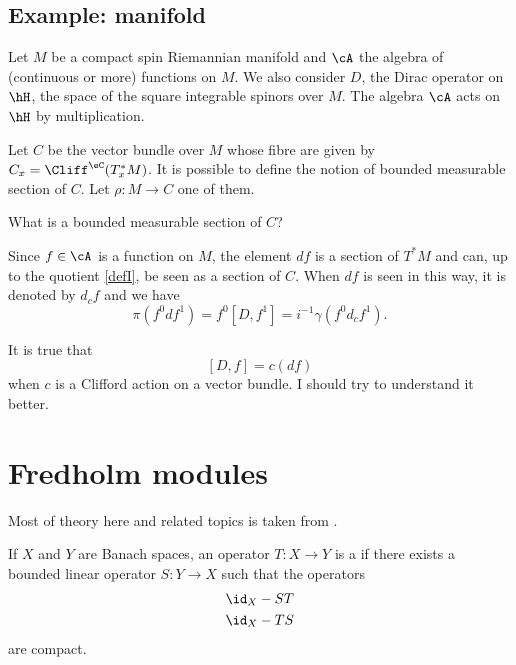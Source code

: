 \subsection{Example: manifold}

Let $M$ be a compact spin Riemannian manifold and $\cA$ the algebra of (continuous or more) functions on $M$. We also consider $D$, the Dirac operator on $\hH$, the space of the square integrable spinors over $M$. The algebra $\cA$ acts on $\hH$ by multiplication.

Let $C$ be the vector bundle over $M$ whose fibre are given by $C_x=\Cliff^{\eC}(T^*_xM)$. It is possible to define the notion of bounded measurable section of $C$. Let $\rho\colon M\to C$ one of them.

\begin{probleme}
	What is a bounded measurable section of $C$?
\end{probleme}

Since $f\in\cA$ is a function on $M$, the element $df$ is a section of $T^*M$ and can, up to the quotient \eqref{defI}, be seen as a section of $C$. When $df$ is seen in this way, it is denoted by $d_cf$ and we have
\[
	\pi(f^0df^1)=f^0[D,f^1]=i^{-1}\gamma(f^0d_cf^1).
\]

\begin{probleme}
	It is true that
	\[
		[D,f]=c(df)
	\]
	when $c$ is a Clifford action on a vector bundle. I should try to understand it better.
\end{probleme}


\section{Fredholm modules}

Most of theory here and related topics is taken from \cite{ConnesNCG,Landi}.

If $X$ and $Y$ are Banach spaces, an operator $T\colon X\to Y$ is a  if there exists a bounded linear operator $S\colon Y\to X$ such that the operators
\begin{subequations}
	\begin{align}
		\id_X-ST \\
		\id_X-TS
	\end{align}
\end{subequations}
are compact.

